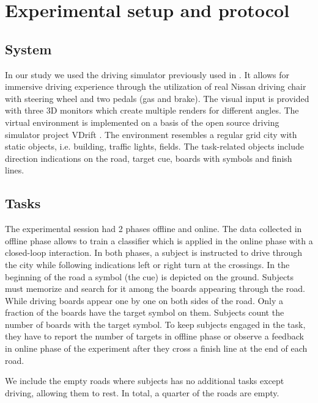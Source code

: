 \documentclass[12pt]{iopart}
\begin{document}
\section{Experimental setup and protocol}
\label{sec:protocol}

\subsection{System}
In our study we used the driving simulator previously used in
\cite{khaliliardali_action_2015,zhang_eeg-based_2015,renold_eeg_2014}.
It allows for immersive driving experience through the utilization
of real Nissan driving chair with steering wheel and two pedals (gas and brake).
The visual input is provided with three 3D monitors which create multiple renders for
different angles. The virtual environment is implemented on a basis of
the open source driving simulator project VDrift \cite{noauthor_about_nodate}.
The environment resembles a regular grid city with static objects, i.e.
building, traffic lights, fields. The task-related objects include
direction indications on the road, target cue, boards with symbols
and finish lines. 

\subsection{Tasks}
The experimental session had 2 phases offline and online.
The data collected in offline phase allows to train a classifier
which is applied in the online phase with a closed-loop interaction.
In both phases, a subject is instructed to drive through the city while
following indications left or right turn at the crossings.
In the beginning of the road a symbol (the cue) is depicted
on the ground. Subjects must memorize and search for it among
the boards appearing through the road.
While driving boards appear one by one
on both sides of the road. Only a fraction of the boards have
the target symbol on them. Subjects 
count the number of boards with the target symbol. 
To keep subjects engaged in the task, they have to
report the number of targets in offline phase or observe a
feedback in online phase of the experiment
after they cross a finish line at the end of each road.

We include the empty roads where subjects has no additional tasks 
except driving, allowing them to rest.
In total, a quarter of the roads are empty.
\end{document}
